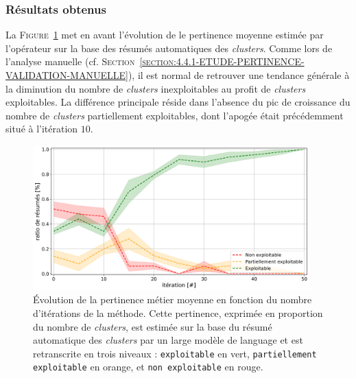 		\subsubsection{Résultats obtenus}
		
			La \textsc{Figure~\ref{figure:4.4.3-ETUDE-PERTINENCE-RESUME-AUTOMATIQUE}} met en avant l'évolution de le pertinence moyenne estimée par l'opérateur
			sur la base des résumés automatiques des \textit{clusters}.
			Comme lors de l'analyse manuelle (cf. \textsc{Section~\ref{section:4.4.1-ETUDE-PERTINENCE-VALIDATION-MANUELLE}}), il est normal de retrouver une tendance générale à la diminution du nombre de \textit{clusters} inexploitables au profit de \textit{clusters} exploitables.
			La différence principale réside dans l'absence du pic de croissance du nombre de \textit{clusters} partiellement exploitables, dont l'apogée était précédemment situé à l'itération $10$.
			
			\begin{figure}[!htb]
				\centering
				\includegraphics[width=0.95\textwidth]{figures/etude-pertinence-llm-check-resume-annotation-favori}
				\caption{
					Évolution de la pertinence métier moyenne en fonction du nombre d'itérations de la méthode.
					Cette pertinence, exprimée en proportion du nombre de \textit{clusters}, est estimée sur la base du résumé automatique des \textit{clusters} par un large modèle de language et est retranscrite en trois niveaux : \texttt{exploitable} en vert, \texttt{partiellement exploitable} en orange, et \texttt{non exploitable} en rouge.
				}
				\label{figure:4.4.3-ETUDE-PERTINENCE-RESUME-AUTOMATIQUE}
			\end{figure}
			
